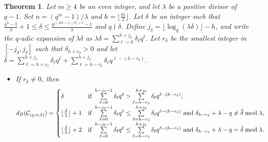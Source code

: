 \documentclass[journal,onecolumn]{IEEEtran}
\newtheorem{theorem}{Theorem}
\begin{document}
\begin{theorem}\label{bosth2}
Let   $m\geq 4$ be an  even integer,  and  let $\lambda$ be a positive divisor of $q-1$.  
Set $n=(q^m-1)/\lambda$ and $h=\lfloor\frac{m}{2}\rfloor$.  
Let  $\delta$ be an integer such that  $ \frac{q^{h}-1}{\lambda}+1 \leq \delta \leq \frac{q^{\lfloor (2m-1)/3\rfloor+1}-1}{\lambda}$ and  $q\nmid \delta$.  Define $j_{\delta} = \lfloor \log_q (\lambda \delta) \rfloor - h$,  and write   the $q$-adic expansion of $\lambda \delta$ as $\lambda \delta=\sum\limits_{\ell=0}^{h + j_{\delta}} \delta_{\ell} q^{\ell}$. Let $r_{\delta}$ be   the smallest integer in $[-j_{\delta},  j_{\delta}]$ such that $\delta_{h + r_{\delta}} > 0$ and let 
$
\hat{\delta} = \sum\limits_{\ell = h + r_{\delta}}^{h + j_{\delta}} \delta_{\ell} q^{\ell} + \sum\limits_{\ell = h - r_{\delta}}^{h + j_{\delta}} \delta_{\ell} q^{\ell - (h- r_{\delta})}.
$
\begin{itemize}
\item 
 If $r_{\delta} \neq 0$, then
\begin{equation}\label{64}
d_B(\mathcal{C}_{(q,n, \delta)}) = \begin{cases}
\delta &\hbox{if }  \sum\limits_{\ell=0}^{h-j_{\delta}-1} \delta_{\ell} q^{\ell} > \sum\limits_{\ell=h - r_{\delta}}^{h + j_{\delta}} \delta_{\ell} q^{\ell - (h - r_{\delta})}, \\
\lfloor \frac{\hat{\delta}}{\lambda}\rfloor + 1 &\hbox{if }  \sum\limits_{\ell=0}^{h-j_{\delta}-1} \delta_{\ell} q^{\ell} \leq \sum\limits_{\ell=h - r_{\delta}}^{h + j_{\delta}} \delta_{\ell} q^{\ell - (h - r_{\delta})} \text{ and } \delta_{h - r_{\delta}}+\lambda -q  \neq \hat{\delta} \bmod \lambda, \\
\lfloor \frac{\hat{\delta}}{\lambda}\rfloor + 2 &\hbox{if }  \sum\limits_{\ell=0}^{h-j_{\delta}-1} \delta_{\ell} q^{\ell} \leq \sum\limits_{\ell=h - r_{\delta}}^{h + j_{\delta}} \delta_{\ell} q^{\ell - (h - r_{\delta})}\text{ and } \delta_{h - r_{\delta}}+\lambda -q  = \hat{\delta} \bmod \lambda.
\end{cases}
\end{equation}


\end{itemize}
\end{theorem}
\end{document}
